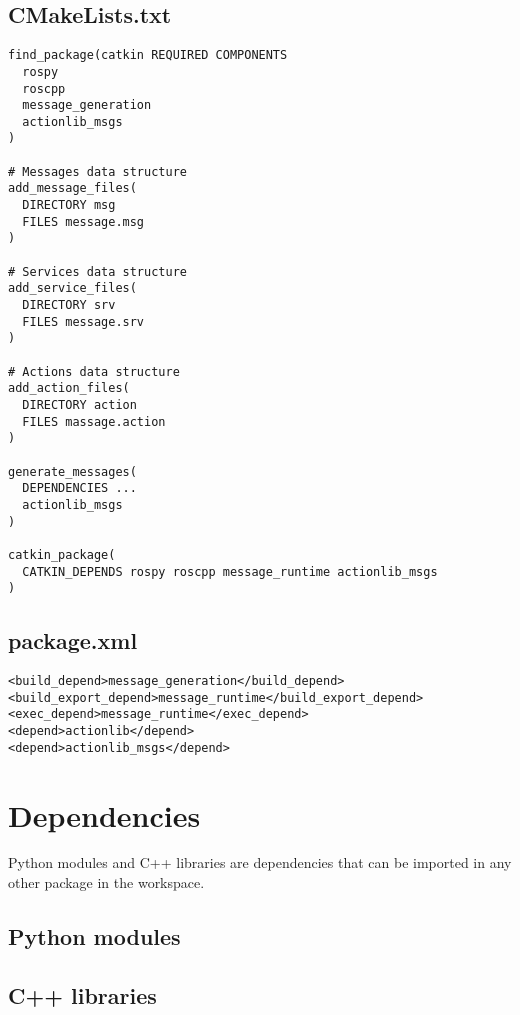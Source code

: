         \subsection{CMakeLists.txt}
\begin{verbatim}
find_package(catkin REQUIRED COMPONENTS
  rospy
  roscpp
  message_generation
  actionlib_msgs
)

# Messages data structure
add_message_files(
  DIRECTORY msg
  FILES message.msg
)

# Services data structure
add_service_files(
  DIRECTORY srv
  FILES message.srv
)

# Actions data structure
add_action_files(
  DIRECTORY action 
  FILES massage.action
)

generate_messages(
  DEPENDENCIES ...
  actionlib_msgs
)

catkin_package(
  CATKIN_DEPENDS rospy roscpp message_runtime actionlib_msgs
)
\end{verbatim}


        \subsection{package.xml}
\begin{verbatim}
<build_depend>message_generation</build_depend>
<build_export_depend>message_runtime</build_export_depend>
<exec_depend>message_runtime</exec_depend>
<depend>actionlib</depend>
<depend>actionlib_msgs</depend>
\end{verbatim}






    \section{Dependencies}
        
        Python modules and C++ libraries are dependencies that can be imported in any other package in the workspace.
        
        
        \subsection{Python modules}
        
        
        
        \subsection{C++ libraries}
        
        
        
        
        
        
        

